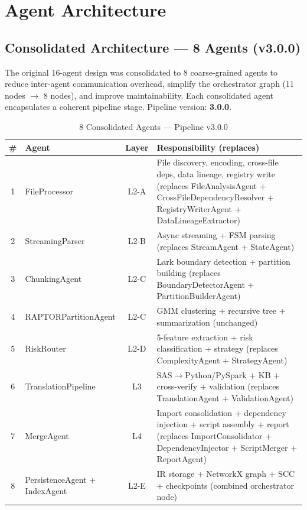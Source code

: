\documentclass[11pt,a4paper]{article}
\begin{document}
\section{Agent Architecture}

\subsection{Consolidated Architecture — 8 Agents (v3.0.0)}

\begin{infobox}
The original 16-agent design was consolidated to 8 coarse-grained agents to reduce inter-agent communication overhead, simplify the orchestrator graph (11 nodes $\to$ 8 nodes), and improve maintainability. Each consolidated agent encapsulates a coherent pipeline stage. Pipeline version: \textbf{3.0.0}.
\end{infobox}

\begin{table}[H]
\centering
\caption{8 Consolidated Agents — Pipeline v3.0.0}
\renewcommand{\arraystretch}{1.25}
\small
\begin{tabularx}{\textwidth}{@{} c l c X @{}}
\toprule
\textbf{\#} & \textbf{Agent} & \textbf{Layer} & \textbf{Responsibility (replaces)} \\
\midrule
1 & FileProcessor & L2-A & File discovery, encoding, cross-file deps, data lineage, registry write (replaces FileAnalysisAgent + CrossFileDependencyResolver + RegistryWriterAgent + DataLineageExtractor) \\
2 & StreamingParser & L2-B & Async streaming + FSM parsing (replaces StreamAgent + StateAgent) \\
3 & ChunkingAgent & L2-C & Lark boundary detection + partition building (replaces BoundaryDetectorAgent + PartitionBuilderAgent) \\
4 & RAPTORPartitionAgent & L2-C & GMM clustering + recursive tree + summarization (unchanged) \\
5 & RiskRouter & L2-D & 5-feature extraction + risk classification + strategy (replaces ComplexityAgent + StrategyAgent) \\
6 & TranslationPipeline & L3 & SAS$\to$Python/PySpark + KB + cross-verify + validation (replaces TranslationAgent + ValidationAgent) \\
7 & MergeAgent & L4 & Import consolidation + dependency injection + script assembly + report (replaces ImportConsolidator + DependencyInjector + ScriptMerger + ReportAgent) \\
8 & PersistenceAgent + IndexAgent & L2-E & IR storage + NetworkX graph + SCC + checkpoints (combined orchestrator node) \\
\bottomrule
\end{tabularx}
\end{table}
\end{document}
